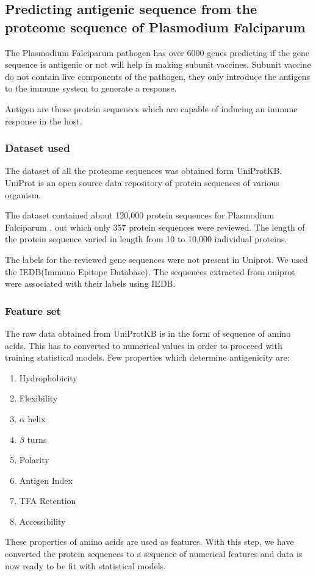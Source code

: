\documentclass[notitlepage]{article}
\begin{document}
	\subsection{Predicting antigenic sequence from the proteome sequence of Plasmodium Falciparum}
	
	The Plasmodium Falciparum pathogen has over 6000 genes\cite{item3} predicting if the gene sequence is antigenic or not will help in making subunit vaccines. Subunit vaccine do not contain live components of the pathogen, they only introduce the antigens to the immune system to generate a response\cite{item4}.
	
	Antigen are those protein sequences which are capable of inducing an immune response in the host.
	
	
	\subsubsection{Dataset used}
	The dataset of all the proteome sequences was obtained form UniProtKB. UniProt is an open source data repository of protein sequences of various organism.
	
	The dataset contained about 120,000 protein sequences for Plasmodium Falciparum , out which only 357 protein sequences were reviewed. The length of the protein sequence varied in length from 10 to 10,000 individual proteins.
	
	The labels for the reviewed gene sequences were not present in Uniprot. We used the IEDB(Immuno Epitope Database). The sequences extracted from uniprot were associated with their labels using IEDB.
	
	\subsubsection{Feature set}
	The raw data obtained from UniProtKB is in the form of sequence of amino acids. This has to converted to numerical values in order to proceeed with training statistical models. Few properties which determine antigenicity are:
	\begin{enumerate}
	\item Hydrophobicity
	\item Flexibility
	\item $\alpha$ helix
	\item $\beta$ turns
	\item Polarity
	\item Antigen Index
	\item TFA Retention
	\item Accessibility
	\end{enumerate}\cite{item7}
	These properties of amino acids are used as features. With this step, we have converted the protein sequences to a sequence of numerical features and data is now ready to be fit with statistical models.  
	
\end{document}

